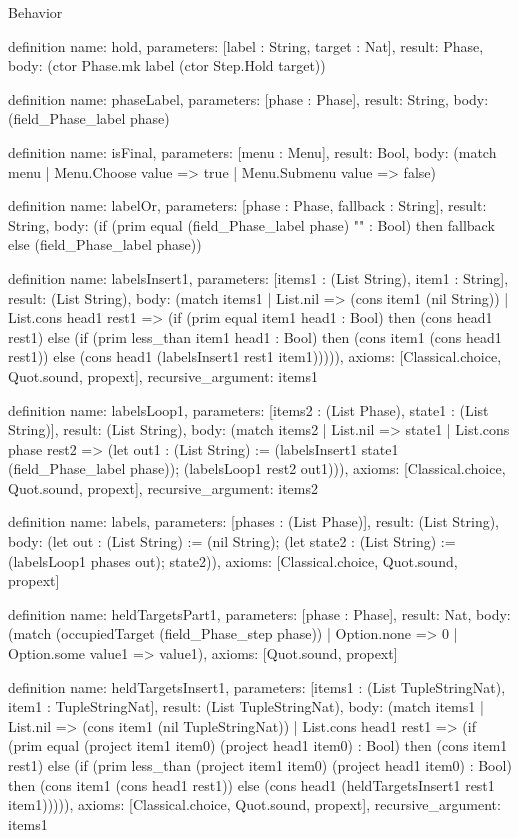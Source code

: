 \begin{lexlean}{Behavior}
\begin{semanticmodule}
definition{
  name: hold,
  parameters: [label : String, target : Nat],
  result: Phase,
  body: (ctor Phase.mk label (ctor Step.Hold target))
}

definition{
  name: phaseLabel,
  parameters: [phase : Phase],
  result: String,
  body: (field_Phase_label phase)
}

definition{
  name: isFinal,
  parameters: [menu : Menu],
  result: Bool,
  body: (match menu | Menu.Choose value => true | Menu.Submenu value => false)
}

definition{
  name: labelOr,
  parameters: [phase : Phase, fallback : String],
  result: String,
  body: (if (prim equal (field_Phase_label phase) "" : Bool) then fallback else (field_Phase_label phase))
}

definition{
  name: labelsInsert1,
  parameters: [items1 : (List String), item1 : String],
  result: (List String),
  body: (match items1
    | List.nil => (cons item1 (nil String))
    | List.cons head1 rest1 => (if (prim equal item1 head1 : Bool) then (cons head1 rest1) else (if (prim less_than item1 head1 : Bool) then (cons item1 (cons head1 rest1)) else (cons head1 (labelsInsert1 rest1 item1))))),
  axioms: [Classical.choice, Quot.sound, propext],
  recursive_argument: items1
}

definition{
  name: labelsLoop1,
  parameters: [items2 : (List Phase), state1 : (List String)],
  result: (List String),
  body: (match items2
    | List.nil => state1
    | List.cons phase rest2 => (let out1 : (List String) := (labelsInsert1 state1 (field_Phase_label phase)); (labelsLoop1 rest2 out1))),
  axioms: [Classical.choice, Quot.sound, propext],
  recursive_argument: items2
}

definition{
  name: labels,
  parameters: [phases : (List Phase)],
  result: (List String),
  body: (let out : (List String) := (nil String); (let state2 : (List String) := (labelsLoop1 phases out); state2)),
  axioms: [Classical.choice, Quot.sound, propext]
}

definition{
  name: heldTargetsPart1,
  parameters: [phase : Phase],
  result: Nat,
  body: (match (occupiedTarget (field_Phase_step phase))
    | Option.none => 0
    | Option.some value1 => value1),
  axioms: [Quot.sound, propext]
}

definition{
  name: heldTargetsInsert1,
  parameters: [items1 : (List TupleStringNat), item1 : TupleStringNat],
  result: (List TupleStringNat),
  body: (match items1
    | List.nil => (cons item1 (nil TupleStringNat))
    | List.cons head1 rest1 => (if (prim equal (project item1 item0) (project head1 item0) : Bool) then (cons item1 rest1) else (if (prim less_than (project item1 item0) (project head1 item0) : Bool) then (cons item1 (cons head1 rest1)) else (cons head1 (heldTargetsInsert1 rest1 item1))))),
  axioms: [Classical.choice, Quot.sound, propext],
  recursive_argument: items1
}


\end{semanticmodule}
\end{lexlean}
